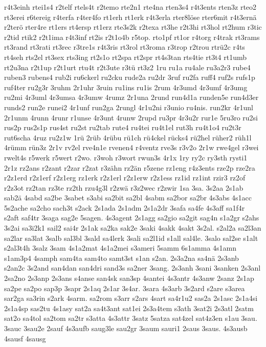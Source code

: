 {r4t3einh
rtei1s4
r2telf
rtels4t
r2temo
rte2n1
rte4na
rten3s4
r4t3ents
rten3z
rteo2
rt3erei
r6tereig
r4terfa
r4ter4fo
rt1erh
rt1erk
r4t3erla
rter8löse
rter6mit
r4t3ernä
r2terö
rter4re
rt1ers
rt4ersp
rt1erz
rte3s2k
r2texa
rt3he
r2t3hi
rt3hol
rt2hum
r3tic
r2tid
rtik2
r2t1ima
r4t3inf
rt2is
r2t1o4b
r5top.
rto1pf
rt1or
r4torg
r4trak
rt3rams
rt3rand
rt3rati
rt3rec
r3tre1s
r4t3ris
rt3rol
rt3roma
r3trop
r2trou
rtrü2c
r4ts
rt4seh
rts2el
rt3sex
rts3ing
rt2s1o
rt2spa
rt2spr
rt4s3tan
rts4tie
rt3t4
rt1umb
rt2u3na
r2t1up
r2t1urt
rtu4t
r2t3ute
r3tü
rt3z2
1ru
ru1a
ru4ale
ru3a2r3
rube4
ruben3
rubens4
rub2i
ru6ckerl
ru2cku
rude2a
ru2dr
3ruf
ru2fa
ruff4
ruf2s
rufs1p
ruf4ter
ru2g3r
3ruhm
2r1uhr
3ruin
ru1ins
ru1is
2rum
4r3umd
4r3umf
4r3umg
ru2mi
4r3uml
4r3umsa
4r3umw
4rumz
2r1una
2rund
run4d1a
runden5e
run4d3er
runds2
run2e
runei2
4r1unf
run2ga
2rungl
4r1u2ni
r3unio
ru4nis.
run2kr
4r1unl
2r1unm
4runn
4runr
r1unse
4r3unt
4runw
2rupd
ru3pr
4r3u2r
rur1e
5ru3ro
ru2si
rus2p
rus2s1p
rus4st
ru2st
ru2tab
rute4
ru4tei
ru4t1el
rut3h
ru4t1o4
ru2t3r
rut6scha
4ruz
ru2z1w
1rü
2rüb
4rübu
rü1ch
rü4ckel
rücks4
rü2hel
rüher2
rüh1l
4rümm
rün3z
2r1v
rv2el
rve4n1e
rvenen4
r4ventz
rve3s
r3v2o
2r1w
rwe4gel
r3wei
rwelt4s
r5werk
r5wert
r2wo.
r3woh
r3wort
rwun3s
4r1x
1ry
ry2c
ry3sth
rysti1
2r1z
rz2ans
r2zant
r2zar
r2zat
r3zähn
rz2än
r5zene
rz1eng
r4z3ents
rze2p
rze2ra
r2z1erd
r2z1erf
r2z1erg
rz1erk
r2z1erl
r2z1erw
r2z1ess
rz1id
rz1int
rzir3
rz2of
r2z3ot
rz2tan
rz3te
rz2th
rzu4g3l
r2zwä
r3z2wec
r2zwir
1sa
3sa.
3s2aa
2s1ab
sab2ä
4sabd
sa2be
3sabet
s3abi
sa2bit
sa2bl
4sabm
sa2bor
sa2br
4s3abs
4s1acc
5s2ache
sa2cho
sach3t
s2ack
2s1ada
2s1adm
2s1a2dr
3safa
sa4fe
4s3aff
sa1f4r
s2aft
saf4tr
3saga
sag2e
5sagen.
4s3agent
2s1agg
sa2gio
sa2git
sag4n
s1a2gr
s2ahs
3s2ai
sa3i2k1
sail2
sai4r
2s1ak
sa2ka
sak2e
3saki
4sakk
4sakt
3s2al.
s2al2a
sa2l3an
sa2lar
sa3lat
3salb
sal3bl
3sald
sa4lerk
3sali
sa2l1id
s1all
sal4le.
3salo
sal2se
s1alt
s2al3t4h
3salz
3sam
4s1a2mat
4s1a2mei
s3ameri
5samm
6s1amma
4s1amn
s1am3p4
4samph
sam4ta
sam4to
samt3st
s1an
s2an.
2s3a2na
sa4nä
2s3anb
s2an2c
3s2and
san4dan
san4dri
sand3s
sa2ner
3sang.
2s3anh
3sani
3sanken
2s3anl
2sa2no
2s3anp
2s3ans
s4anse
san4sk
san3sp
4santei
4s3antr
4s3anw
2sanz
2s1ap
sa2pe
sa2po
sap3p
3sapr
2s1aq
2s1ar
3s4ar.
3sara
4s3arb
3s2ard
s2are
s3area
sar2ga
sa3rin
s2ark
4sarm.
sa2rom
s3arr
s2ars
4sart
sa4r1u2
sas2a
2s1asc
2s1a4si
2s1a4sp
sas2tu
4s1asy
sat2a
sa4t3ant
sat1ei
2s3a4tem
s3ath
3sat2i
2s3atl
2satm
sat2o
sa4tol
sa2tom
sa2tr
s3atta
4s3attr
3satz
5satza
sat4zel
sat4z3en
s1au
3sau.
3sauc
3sau2e
2sauf
4s3aufb
saug3le
sau2gr
3saum
sauri1
2saus
3saus.
4s3ausb
4sausf
4sausg
}
